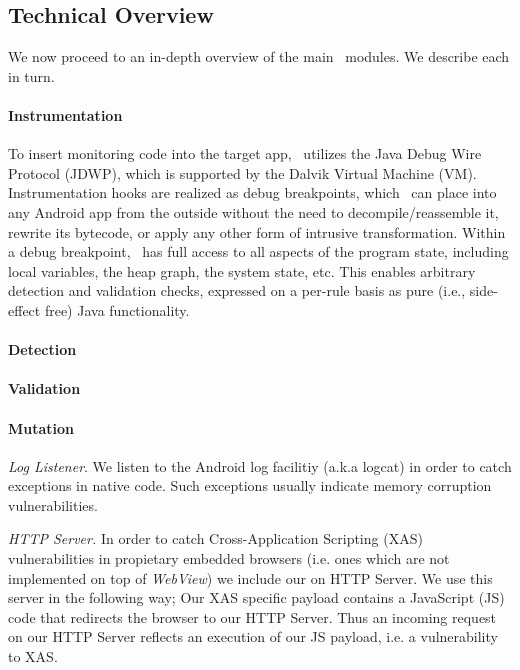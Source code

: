 \subsection{Technical Overview}

We now proceed to an in-depth overview of the main \Tool\ modules. We describe each in turn.

\paragraph{Instrumentation} To insert monitoring code into the target app, \Tool\ utilizes the Java Debug Wire Protocol (JDWP), which is supported by the Dalvik Virtual Machine (VM). Instrumentation hooks are realized as debug breakpoints, which \Tool\ can place into any Android app from the outside without the need to decompile/reassemble it, rewrite its bytecode, or apply any other form of intrusive transformation. 
%
Within a debug breakpoint, \Tool\ has full access to all aspects of the program state, including local variables, the heap graph, the system state, etc. This enables arbitrary detection and validation checks, expressed on a per-rule basis as pure (i.e., side-effect free) Java functionality. 


\paragraph{Detection}

\paragraph{Validation}

\paragraph{Mutation}



\textit{Log Listener}. We listen to the Android log facilitiy (a.k.a
logcat) in order to catch exceptions in native code. Such exceptions
usually indicate memory corruption vulnerabilities.

\textit{HTTP Server.} In order to catch Cross-Application Scripting
(XAS) vulnerabilities in propietary embedded browsers (i.e. ones which
are not implemented on top of \textit{WebView}) we include our on
HTTP Server. We use this server in the following way; Our XAS specific
payload contains a JavaScript (JS) code that redirects the browser
to our HTTP Server. Thus an incoming request on our HTTP Server reflects
an execution of our JS payload, i.e. a vulnerability to XAS.

